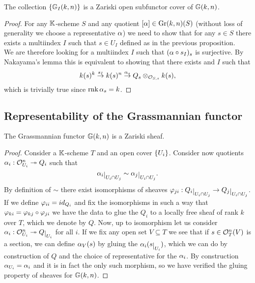 \begin{proposition}\label{GrIAreOpenCover}
The collection $\left\{{\mathbb{G}_I(k,n)}\right\}$ is a Zariski open subfunctor cover of $\mathbb{G}(k,n)$.
\end{proposition}
\begin{proof}
For any $\mathbb{K}$-scheme $S$ and any quotient $[\alpha]\in \mathrm{Gr}(k,n)(S)$ (without loss of generality we choose a representative $\alpha$) we need to show that for any $s\in S$ there exists a multiindex $I$ such that $s\in U_I$ defined as in the previous proposition.\\
We are therefore looking for a multiindex $I$ such that $(\alpha\circ s_I)_s$ is surjective. By Nakayama's lemma this is equivalent to showing that there exists and $I$ such that
\[k(s)^k\overset{s_I}\to k(s)^n\overset{\alpha_s}\to Q_s\otimes_{\mathcal{O}_{S,s}}k(s),\]
which is trivially true since $\mathrm{rnk}\, \alpha_s=k$.
\end{proof}


\subsection{Representability of the Grassmannian functor}
\begin{proposition}
The Grassmannian functor $\mathbb{G}(k,n)$ is a Zariski sheaf.
\end{proposition}
\begin{proof}
Consider a $\mathbb{K}$-scheme $T$ and an open cover $\left\{{U_i}\right\}$. Consider now quotients $\alpha_i:\mathcal{O}_{U_i}^n\twoheadrightarrow Q_i$ such that 
\[\al_i\res{U_i\cap U_j}\sim \al_j\res{U_i\cap U_j}.\]	
By definition of $\sim$ there exist isomorphisms of sheaves $\vp_{ji}:Q_i\res{U_{i}\cap U_j}\to Q_j\res{U_i\cap U_j}$. If we define $\varphi_{ii}=id_{Q_i}$ and fix the isomorphisms in such a way that $\varphi_{ki}=\varphi_{kj}\circ \varphi_{ji}$ we have the data to glue the $Q_i$ to a locally free sheaf of rank $k$ over $T$, which we denote by $Q$. Now, up to isomorphism let us consider $\al_i:\Oc_{U_i}^n\onto Q\res{U_i}$ for all $i$. If we fix any open set $V\subseteq T$ we see that if $s\in \mathcal{O}_T^n(V)$ is a section, we can define $\alpha_V(s)$ by gluing the $\al_i(s\res{U_i})$, which we can do by construction of $Q$ and the choice of representative for the $\alpha_i$. By construction $\alpha_{U_i}=\alpha_i$ and it is in fact the only such morphism, so we have verified the gluing property of sheaves for $\mathbb{G}(k,n)$.
\end{proof}

